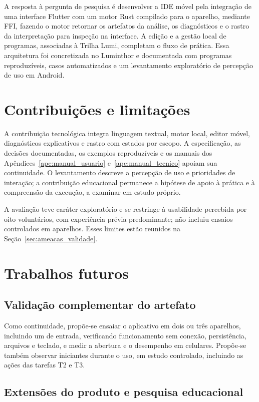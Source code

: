 \documentclass[
    12pt
    ,oneside
    ,a4paper
    ,chapter=TITLE
    ,section=TITLE
    ,sumario=abnt-6027-2012]{abntex2}
\begin{document}
A resposta à pergunta de pesquisa é desenvolver a IDE móvel pela integração de
uma interface Flutter com um motor Rust compilado para o aparelho, mediante
FFI, fazendo o motor retornar os artefatos da análise, os diagnósticos e o rastro
da interpretação para inspeção na interface. A edição e a gestão local de
programas, associadas à Trilha Lumi, completam o fluxo de prática. Essa arquitetura
foi concretizada no Luminthor e documentada com programas reproduzíveis, casos
automatizados e um levantamento exploratório de percepção de uso em Android.

\section{Contribuições e limitações}

A contribuição tecnológica integra linguagem textual, motor local, editor móvel,
diagnósticos explicativos e rastro com estados por escopo. A especificação, as
decisões documentadas, os exemplos reproduzíveis e os manuais dos
Apêndices~\ref{ape:manual_usuario} e~\ref{ape:manual_tecnico} apoiam sua
continuidade. O levantamento descreve a percepção de uso e prioridades de
interação; a contribuição educacional permanece a hipótese de apoio à prática
e à compreensão da execução, a examinar em estudo próprio.

A avaliação teve caráter exploratório e se restringe à usabilidade percebida por
oito voluntários, com experiência prévia predominante; não incluiu ensaios
controlados em aparelhos. Esses limites estão reunidos na
Seção~\ref{sec:ameacas_validade}.

\section{Trabalhos futuros}

\subsection{Validação complementar do artefato}

Como continuidade, propõe-se ensaiar o aplicativo em dois ou três aparelhos,
incluindo um de entrada, verificando funcionamento sem conexão, persistência,
arquivos e teclado, e medir a abertura e o desempenho em celulares. Propõe-se
também observar iniciantes durante o uso, em estudo controlado, incluindo as
ações das tarefas T2 e T3.

\subsection{Extensões do produto e pesquisa educacional}
\end{document}
